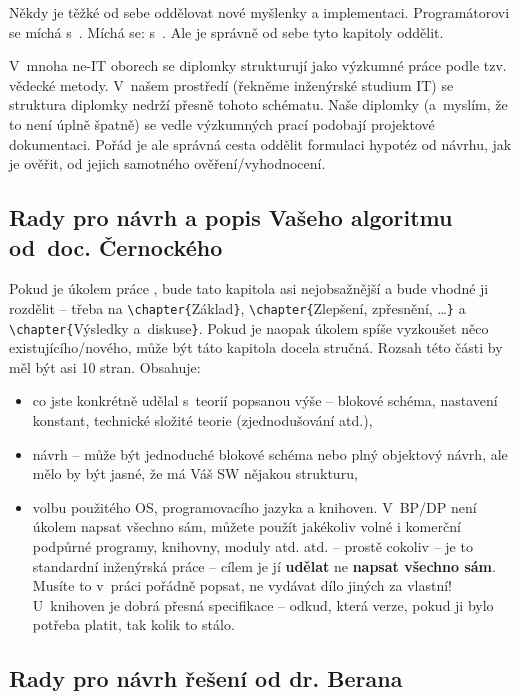 Někdy je těžké od sebe oddělovat nové myšlenky a implementaci. Programátorovi se míchá  s~. Míchá se:  s~. Ale je správně od sebe tyto kapitoly oddělit.

V~mnoha ne-IT oborech se diplomky strukturují jako výzkumné práce podle tzv. vědecké metody. V~našem prostředí (řekněme inženýrské studium IT) se struktura diplomky nedrží přesně tohoto schématu. Naše diplomky (a~myslím, že to není úplně špatně) se vedle výzkumných prací podobají projektové dokumentaci. Pořád je ale správná cesta oddělit formulaci hypotéz od návrhu, jak je ověřit, od jejich samotného ověření/vyhodnocení.

\subsection*{Rady pro návrh a popis Vašeho algoritmu od~doc. Černockého}

Pokud je úkolem práce , bude tato kapitola asi nejobsažnější a bude vhodné ji rozdělit -- třeba na \texttt{\textbackslash chapter\{}Základ\texttt{\}}, \texttt{\textbackslash chapter\{}Zlepšení, zpřesnění, \ldots\texttt{\}} a \texttt{\textbackslash chapter\{}Výsledky a~diskuse\texttt{\}}. Pokud je naopak úkolem spíše vyzkoušet něco existujícího/nového, může být táto kapitola docela stručná. Rozsah této části by měl být asi 10 stran. Obsahuje:
\begin{itemize}
  \item{co jste konkrétně udělal s~teorií popsanou výše -- blokové schéma, nastavení konstant, technické  složité teorie (zjednodušování atd.),}
  \item{návrh -- může být jednoduché blokové schéma nebo plný objektový návrh, ale mělo by být jasné, že má Váš SW nějakou strukturu,}
  \item{volbu použitého OS, programovacího jazyka a knihoven. V~BP/DP není úkolem napsat všechno sám, můžete použít jakékoliv volné i komerční podpůrné programy, knihovny, moduly atd. atd. -- prostě cokoliv -- je to standardní inženýrská práce -- cílem je jí \textbf{udělat} ne \textbf{napsat všechno sám}. Musíte to v~práci pořádně popsat, ne vydávat dílo jiných za vlastní! U~knihoven je dobrá přesná specifikace -- odkud, která verze, pokud ji bylo potřeba platit, tak kolik to stálo.}
\end{itemize}

\subsection*{Rady pro návrh řešení od dr. Berana}

